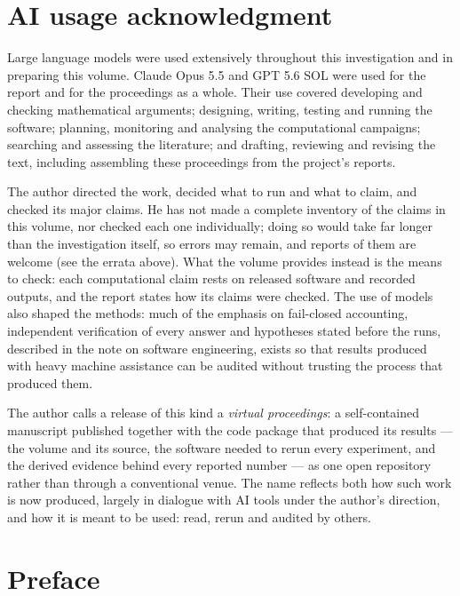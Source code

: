 \documentclass[11pt,a4paper,oneside]{report}
\theoremstyle{definition}
\begin{document}
\chapter*{AI usage acknowledgment}

Large language models were used extensively throughout this investigation and in preparing this
volume. Claude Opus 5.5 and GPT 5.6 SOL were used for the report and for the proceedings as a
whole. Their use covered developing and checking mathematical arguments; designing, writing,
testing and running the software; planning, monitoring and analysing the computational campaigns;
searching and assessing the literature; and drafting, reviewing and revising the text, including
assembling these proceedings from the project's reports.

The author directed the work, decided what to run and what to claim, and checked its major
claims. He has not made a complete inventory of the claims in this volume, nor checked each one
individually; doing so would take far longer than the investigation itself, so errors may remain,
and reports of them are welcome (see the errata above). What the volume provides instead is the
means to check: each computational claim rests on released software and recorded outputs, and the
report states how its claims were checked. The use of models also shaped the methods: much of the
emphasis on fail-closed accounting, independent verification of every answer and hypotheses stated
before the runs, described in the note on software engineering, exists so that results produced with heavy machine assistance can be audited without
trusting the process that produced them.

The author calls a release of this kind a \emph{virtual proceedings}: a self-contained manuscript
published together with the code package that produced its results --- the volume and its source,
the software needed to rerun every experiment, and the derived evidence behind every reported
number --- as one open repository rather than through a conventional venue. The name reflects both
how such work is now produced, largely in dialogue with AI tools under the author's direction, and
how it is meant to be used: read, rerun and audited by others.

\chapter*{Preface}
\end{document}
